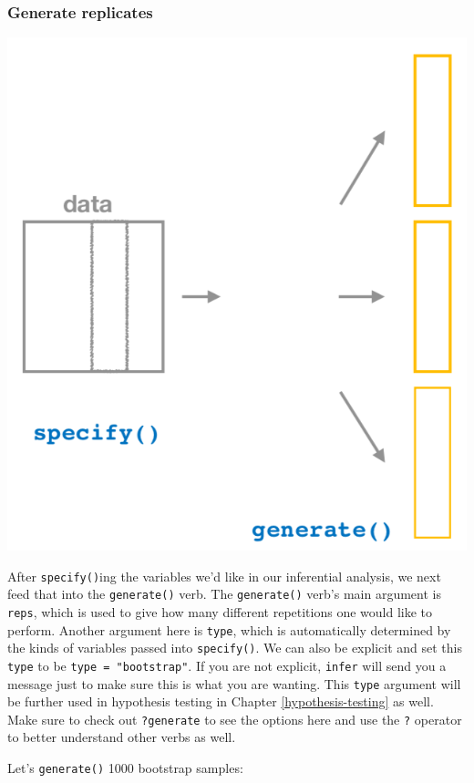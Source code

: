 \documentclass[12pt, krantz2,]{krantz}
\makeatletter
\newenvironment{Shaded}{\begin{snugshade}}{\end{snugshade}}
\newcommand{\DataTypeTok}[1]{\textcolor[rgb]{0.27,0.27,0.27}{#1}}
\newcommand{\DecValTok}[1]{\textcolor[rgb]{0.06,0.06,0.06}{#1}}
\newcommand{\KeywordTok}[1]{\textcolor[rgb]{0.27,0.27,0.27}{\textbf{#1}}}
\newcommand{\NormalTok}[1]{#1}
\newcommand{\OperatorTok}[1]{\textcolor[rgb]{0.43,0.43,0.43}{\textbf{#1}}}
\newcommand{\StringTok}[1]{\textcolor[rgb]{0.5,0.5,0.5}{#1}}
\newenvironment{kframe}{%
\medskip{}
\setlength{\fboxsep}{.8em}
 \def\at@end@of@kframe{}%
 \ifinner\ifhmode%
  \def\at@end@of@kframe{\end{minipage}}%
  \begin{minipage}{\columnwidth}%
 \fi\fi%
 \def\FrameCommand##1{\hskip\@totalleftmargin \hskip-\fboxsep
 \colorbox{shadecolor}{##1}\hskip-\fboxsep
     \hskip-\linewidth \hskip-\@totalleftmargin \hskip\columnwidth}%
 \MakeFramed {\advance\hsize-\width
   \@totalleftmargin\z@ \linewidth\hsize
   \@setminipage}}%
 {\par\unskip\endMakeFramed%
 \at@end@of@kframe}
\renewenvironment{Shaded}{\begin{kframe}}{\end{kframe}}
\makeatother
\begin{document}
\hypertarget{generate-replicates}{%
\subsubsection*{Generate replicates}\label{generate-replicates}}


\begin{center}\includegraphics[width=0.7\linewidth]{images/flowcharts/infer/generate} \end{center}

After \texttt{specify()}ing the variables we'd like in our inferential analysis, we next feed that into the \texttt{generate()} verb. The \texttt{generate()} verb's main argument is \texttt{reps}, which is used to give how many different repetitions one would like to perform. Another argument here is \texttt{type}, which is automatically determined by the kinds of variables passed into \texttt{specify()}. We can also be explicit and set this \texttt{type} to be \texttt{type\ =\ "bootstrap"}. If you are not explicit, \texttt{infer} will send you a message just to make sure this is what you are wanting. This \texttt{type} argument will be further used in hypothesis testing in Chapter \ref{hypothesis-testing} as well. Make sure to check out \texttt{?generate} to see the options here and use the \texttt{?} operator to better understand other verbs as well.

Let's \texttt{generate()} 1000 bootstrap samples:

\begin{Shaded}
\end{Shaded}
\end{document}
